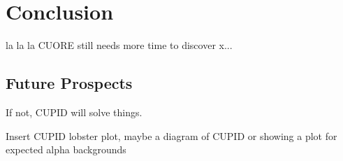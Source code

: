 \chapter{Conclusion}
la la la CUORE still needs more time to discover x...

\section{Future Prospects}
If not, CUPID will solve things.

Insert CUPID lobster plot, maybe a diagram of CUPID or showing a plot for expected alpha backgrounds